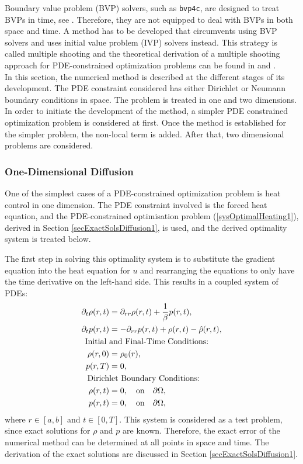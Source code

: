 Boundary value problem (BVP) solvers, such as \texttt{bvp4c}, are designed to treat BVPs in time, see \cite{bvp4cPaper1}. Therefore, they are not equipped to deal with BVPs in both space and time. A method has to be developed that circumvents using BVP solvers and uses initial value problem (IVP) solvers instead. This strategy is called multiple shooting and the theoretical derivation of a multiple shooting approach for PDE-constrained optimization problems can be found in \cite{CarraroIndMultipleShooting} and \cite{CarraroDirectIndirectMultipleShooting}.
\\
In this section, the numerical method is described at the different stages of its development. 
The PDE constraint considered has either Dirichlet or Neumann boundary conditions in space. The problem is treated in one and two dimensions. In order to initiate the development of the method, a simpler PDE constrained optimization problem is considered at first. Once the method is established for the simpler problem, the non-local term is added. After that, two dimensional problems are considered.

\subsubsection{One-Dimensional Diffusion} \label{secNumericsOneDDiffusion1}
One of the simplest cases of a PDE-constrained optimization problem is heat control in one dimension. The PDE constraint involved is the forced heat equation, and the PDE-constrained optimisation problem (\ref{sysOptimalHeating1}), derived in Section \ref{secExactSolsDiffusion1}, is used, and the derived optimality system is treated below. 

The first step in solving this optimality system is to substitute the gradient equation into the heat equation for $u$ and rearranging the equations to only have the time derivative on the left-hand side.
This results in a coupled system of PDEs: 
\begin{align}\label{sysOneDimHeatEqunOptisys1}
\partial_t \rho(r,t) &= \partial_{rr}\rho(r,t) + \frac{1}{\beta}p(r,t),\\
\partial_t p(r,t) &= - \partial_{rr} p(r,t) + \rho(r,t) -\hat{\rho}(r,t), \notag \\
\text{Initial } & \text{and  Final-Time Conditions:}\notag\\
\rho(r,0)&=\rho_0(r),\notag\\
p(r,T) &=0,\notag\\
\text{Dirich} &\text{let  Boundary Conditions:}\notag\\
\rho(r,t) &=0,\quad \text{on} \quad \partial \Omega,\notag\\
p(r,t) &=0,\quad \text{on} \quad \partial \Omega,\notag
\end{align}
where $r \in [a,b]$ and $t \in [0,T]$.
This system is considered as a test problem, since exact solutions for $\rho$ and $p$ are known. Therefore, the exact error of the numerical method can be determined at all points in space and time. The derivation of the exact solutions are discussed in Section \ref{secExactSolsDiffusion1}.

